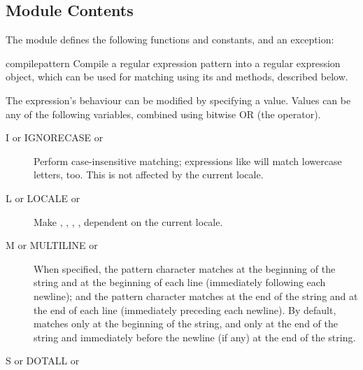 \subsection{Module Contents}

The module defines the following functions and constants, and an exception:

\renewcommand{\indexsubitem}{(in module re)}

\begin{funcdesc}{compile}{pattern}
  Compile a regular expression pattern into a regular expression
  object, which can be used for matching using its  and
   methods, described below.  

  The expression's behaviour can be modified by specifying a
   value.  Values can be any of the following variables,
  combined using bitwise OR (the \code{|} operator).

\begin{description}


\item[I or IGNORECASE or \quad]

Perform case-insensitive matching; expressions like \code{[A-Z]} will match
lowercase letters, too.  This is not affected by the current locale.

\item[L or LOCALE or \quad]

Make , , ,
, dependent on the current locale. 

\item[M or MULTILINE or \quad]

When specified, the pattern character \code{\^} matches at the
  beginning of the string and at the beginning of each line
  (immediately following each newline); and the pattern character
\code{\$} matches at the end of the string and at the end of each line
(immediately preceding each newline).
By default, \code{\^} matches only at the beginning of the string, and
\code{\$} only at the end of the string and immediately before the
newline (if any) at the end of the string. 

\item[S or DOTALL or \quad]


\end{description}
\end{funcdesc}
